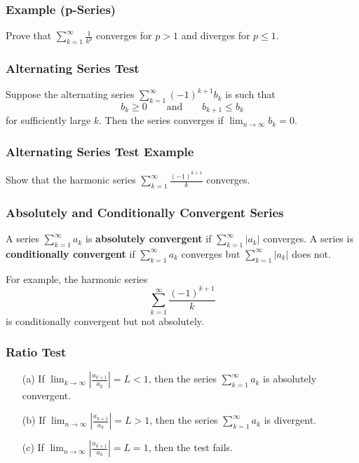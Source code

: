 \documentclass{beamer}
\begin{document}
  \begin{frame}[t]
  \frametitle{Example (p-Series)}
  \begin{Example}
  Prove that $\displaystyle\sum_{k = 1}^\infty \frac{1}{k^p}$ converges for $p > 1$ and diverges for $p\leq 1$.
  \end{Example}
  
  \end{frame}
  
  \begin{frame}
  \frametitle{Alternating Series Test}
  
  \begin{Theorem} 
Suppose the alternating series $\displaystyle\sum_{k = 1}^\infty (-1)^{k + 1} b_k$ is such that
  $$
  b_k \geq 0 \qquad\text{and}\qquad b_{k + 1} \leq b_k
  $$
 for sufficiently large $k$. Then the series converges if $\displaystyle\lim_{n\to\infty} b_k = 0$.
  \end{Theorem}
  \end{frame}
   
  \begin{frame}[t]
 \frametitle{Alternating Series Test Example}
 \begin{Example}
 Show that the harmonic series $\displaystyle\sum_{k = 1}^\infty \frac{(-1)^{k + 1}}{k}$ converges.
 \end{Example}
 
 \end{frame}
 
 
 \begin{frame}
  \frametitle{Absolutely and Conditionally Convergent Series}
  
  \begin{Definition}
  A series $\displaystyle\sum_{k = 1}^\infty a_k$ is {\bf absolutely convergent} if $\displaystyle\sum_{k = 1}^\infty |a_k|$ converges. A series is {\bf conditionally convergent} if $\displaystyle\sum_{k = 1}^\infty a_k$ converges but $\displaystyle\sum_{k = 1}^\infty |a_k|$ does not.
  \end{Definition}
  For example, the harmonic series
  $$
  \sum_{k = 1}^\infty \frac{(-1)^{k + 1}}{k}
  $$
  is conditionally convergent but not absolutely. 
  
 \end{frame}
 
 \begin{frame}
   \frametitle{Ratio Test}
   \begin{Theorem}
   \begin{enumerate}
   \item[(a)] If $\displaystyle\lim_{k\to\infty} \left|\frac{a_{k + 1}}{a_k}\right| = L < 1$, then the series $\displaystyle\sum_{k = 1}^\infty a_k$ is absolutely convergent.
   \item[(b)] If $\displaystyle\lim_{n\to\infty}\left|\frac{a_{k + 1}}{a_k}\right| = L > 1$, then the series $\displaystyle\sum_{k = 1}^\infty a_k$  is divergent.
   \item[(c)] If $\displaystyle\lim_{n\to\infty}\left|\frac{a_{k + 1}}{a_k}\right| = L = 1$, then the test fails.
   \end{enumerate}
   \end{Theorem}
 \end{frame}
 
\end{document}
